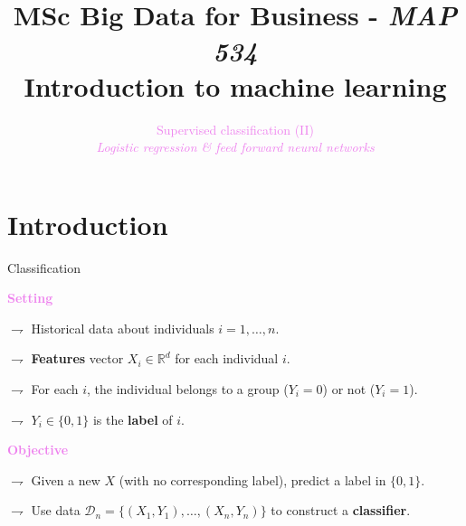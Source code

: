 \documentclass[9pt]{beamer}
\title[Introduction to machine learning]{MSc Big Data for Business - {\em MAP 534} \\
Introduction to machine learning\\}
\author{}
\date{}
\newcommand\R{\mathds{R}}
\begin{document}
\author[S. Le Corff]{\textcolor{violet}{Supervised classification (II)}\\ {\em {\small \textcolor{violet}{Logistic regression \& feed forward neural networks}}}}

\begin{frame}
\titlepage
\end{frame}

\section{Introduction}
\begin{frame}{Classification}

\textcolor{violet}{{\bf Setting}}

$\rightharpoondown$ Historical data  about \alert{individuals $i=1, \ldots, n$}.

$\rightharpoondown$ \textbf{Features} vector $X_i \in \R^d$ for each individual $i$.

$\rightharpoondown$ For each $i$, the individual \alert{belongs to a group} ($Y_i = 0$) or not ($Y_i = 1$).

$\rightharpoondown$ $Y_i \in \{ 0, 1 \}$ is  the \textbf{label} of $i$.


\vspace{.6cm}

\textcolor{violet}{{\bf Objective}}

$\rightharpoondown$ Given a new $X$ (with no corresponding label), \alert{predict a label in $\{ 0, 1 \}$}.

$\rightharpoondown$ Use data $\mathcal{D}_n = \{ (X_1, Y_1), \ldots, (X_n, Y_n) \}$ \alert{to construct a  \textbf{classifier}}.

\end{frame}
\end{document}
